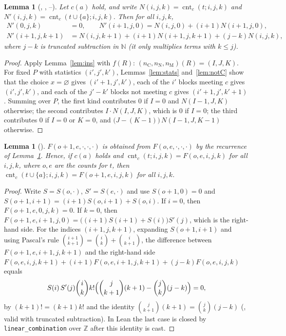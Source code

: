 \documentclass[11pt]{amsart}
\theoremstyle{plain}
\newtheorem{lemma}[theorem]{Lemma}
\theoremstyle{definition}
\newcommand{\N}{\mathbb{N}}
\newcommand{\nC}{n_{\mathrm C}}
\newcommand{\nN}{n_{\mathrm N}}
\newcommand{\nM}{n_{\mathrm M}}
\newcommand{\cnt}{\operatorname{cnt}}
\begin{document}
\begin{lemma}[, , --]\label{lem:rec}
Let $c(a)$ hold, and write $N(i,j,k)=\cnt_c(t;i,j,k)$ and $N'(i,j,k)=\cnt_c(t\cup\{a\};i,j,k)$. Then for all $i,j,k$,
\begin{align*}
  N'(0,j,k)&=0,\qquad N'(i+1,j,0)=N(i,j,0)+(i+1)N(i+1,j,0),\\
  N'(i+1,j,k+1)&=N(i,j,k+1)+(i+1)N(i+1,j,k+1)+(j-k)N(i,j,k),
\end{align*}
where $j-k$ is truncated subtraction in $\N$ (it only multiplies terms with $k\le j$).
\end{lemma}

\begin{proof}
Apply Lemma~\ref{lem:ins} with $f(R)$: $(\nC,\nN,\nM)(R)=(I,J,K)$. For fixed $P$ with statistics $(i',j',k')$, Lemmas~\ref{lem:stats} and~\ref{lem:notC} show that the choice $x=\varnothing$ gives $(i'+1,j',k')$, each of the $i'$ blocks meeting $c$ gives $(i',j',k')$, and each of the $j'-k'$ blocks not meeting $c$ gives $(i'+1,j',k'+1)$.
Summing over $P$, the first kind contributes $0$ if $I=0$ and $N(I-1,J,K)$ otherwise; the second contributes $I\cdot N(I,J,K)$, which is $0$ if $I=0$; the third contributes $0$ if $I=0$ or $K=0$, and $\bigl(J-(K-1)\bigr)\,N(I-1,J,K-1)$ otherwise.
\end{proof}

\begin{lemma}[]\label{lem:step}
$F(o+1,e,\cdot,\cdot,\cdot)$ is obtained from $F(o,e,\cdot,\cdot,\cdot)$ by the recurrence of Lemma~\ref{lem:rec}. Hence, if $c(a)$ holds and $\cnt_c(t;i,j,k)=F(o,e,i,j,k)$ for all $i,j,k$, where $o,e$ are the counts for $t$, then $\cnt_c(t\cup\{a\};i,j,k)=F(o+1,e,i,j,k)$ for all $i,j,k$.
\end{lemma}

\begin{proof}
Write $S=S(o,\cdot)$, $S'=S(e,\cdot)$ and use $S(o+1,0)=0$ and $S(o+1,i+1)=(i+1)S(o,i+1)+S(o,i)$.
If $i=0$, then $F(o+1,e,0,j,k)=0$.
If $k=0$, then $F(o+1,e,i+1,j,0)=\bigl((i+1)S(i+1)+S(i)\bigr)S'(j)$, which is the right-hand side.
For the indices $(i+1,j,k+1)$, expanding $S(o+1,i+1)$ and using Pascal's rule $\binom{i+1}{k+1}=\binom ik+\binom i{k+1}$, the difference between $F(o+1,e,i+1,j,k+1)$ and the right-hand side
$F(o,e,i,j,k+1)+(i+1)F(o,e,i+1,j,k+1)+(j-k)F(o,e,i,j,k)$ equals
\[
  S(i)\,S'(j)\binom ik k!\Bigl(\binom j{k+1}(k+1)-\binom jk(j-k)\Bigr)=0,
\]
by $(k+1)!=(k+1)k!$ and the identity $\binom j{k+1}(k+1)=\binom jk(j-k)$ (, valid with truncated subtraction).
In Lean the last case is closed by \texttt{linear\_combination} over $\mathbb Z$ after this identity is cast.
\end{proof}
\end{document}
